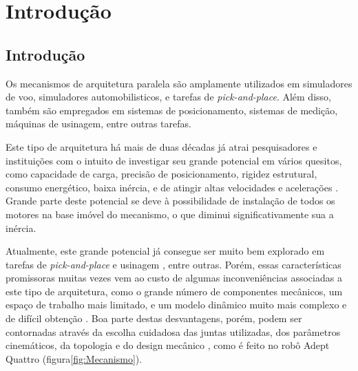 \documentclass[]{politex}
\begin{document}
\sumario




\part{Introdução}
	
\chapter{Introdução}

Os mecanismos de arquitetura paralela são amplamente utilizados em simuladores de voo, simuladores automobilisticos, e tarefas de {\em pick-and-place}. Além disso, também são empregados em sistemas de posicionamento, sistemas de medição, máquinas de usinagem, entre outras tarefas. 

Este tipo de arquitetura há mais de duas décadas já atrai pesquisadores e instituições com o intuito de investigar seu grande potencial em vários quesitos, como capacidade de carga, precisão de posicionamento, rigidez estrutural, consumo energético, baixa inércia, e de atingir altas velocidades e acelerações \cite{Cheng, Khalil, Merlet2002, Pashkevich, Tsai}. Grande parte deste potencial se deve à possibilidade de instalação de todos os motores na base imóvel do mecanismo, o que diminui significativamente sua a inércia. 

Atualmente, este grande potencial já consegue ser muito bem explorado em tarefas de {\em pick-and-place} \cite{Clavel} e usinagem \cite{Pashkevich}, entre outras. Porém, essas características promissoras muitas vezes vem ao custo de algumas inconveniências associadas a este tipo de arquitetura, como o grande número de componentes mecânicos, um espaço de trabalho mais limitado, e um modelo dinâmico muito mais complexo e de difícil obtenção \cite{Rynaldo, Merlet2002}. Boa parte destas desvantagens, porém, podem ser contornadas através da escolha cuidadosa das juntas utilizadas, dos parâmetros cinemáticos, da topologia e do design mecânico \cite{Briot, Campos, Jiang, Zhan}, como é feito no robô Adept Quattro (figura\ref{fig:Mecanismo}).
\end{document}
